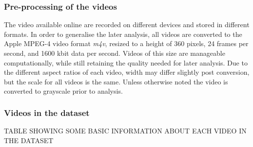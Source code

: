 \subsubsection{Pre-processing of the videos}
%
The video available online are recorded on different devices and stored in different formats. In order to generalise the later analysis, all videos are converted to the Apple MPEG-4 video format \textit{m4v}, resized to a height of 360 pixels, 24 frames per second, and 1600 kbit data per second. Videos of this size are manageable computationally, while still retaining the quality needed for later analysis. Due to the different aspect ratios of each video, width may differ slightly post conversion, but the scale for all videos is the same. Unless otherwise noted the video is converted to grayscale prior to analysis.
%
%
%
%
%
%
%
%
\subsubsection{Videos in the dataset}
%
TABLE SHOWING SOME BASIC INFORMATION ABOUT EACH VIDEO IN THE DATASET